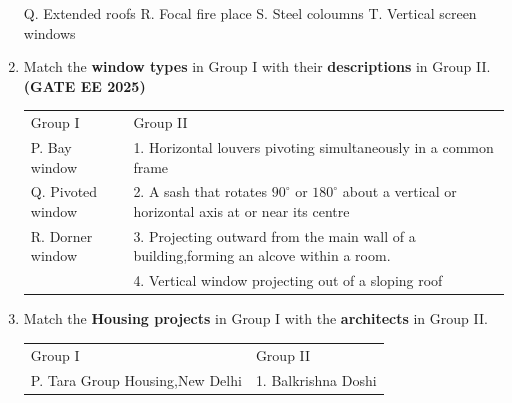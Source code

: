 \documentclass[journal,12pt,onecolumn]{IEEEtran}
\theoremstyle{remark}
\begin{document}
\begin{enumerate}
\newline
Q. Extended roofs
\newline
R. Focal fire place
\newline
S. Steel coloumns
\newline
T. Vertical screen windows
\begin{enumerate}
\end{enumerate}
  
\item Match the \textbf{window types} in Group I with their \textbf{descriptions} in Group II. \hfill \textbf{(GATE EE 2025)}
\newline
\begin{tabular}{p{}p{}}
  Group I   & Group II \\
P. Bay window     & 1. Horizontal louvers pivoting simultaneously in a common frame\\
Q. Pivoted window & 2. A sash that rotates $90^\circ$ or $180^\circ$ about a vertical or horizontal axis at or near its centre\\
R. Dorner window & 3. Projecting outward from the main wall of a building,forming an alcove within a room.\\
  & 4. Vertical window projecting out of a sloping roof\\
\end{tabular}
\begin{enumerate}
\end{enumerate}
\item Match the \textbf{Housing projects} in Group I with the \textbf{architects} in Group II.
\newline
\begin{tabular}{p{}p{}}
  Group I   & Group II \\
  P. Tara Group Housing,New Delhi   &1. Balkrishna Doshi\\

\end{tabular}
\end{enumerate}
\end{document}
